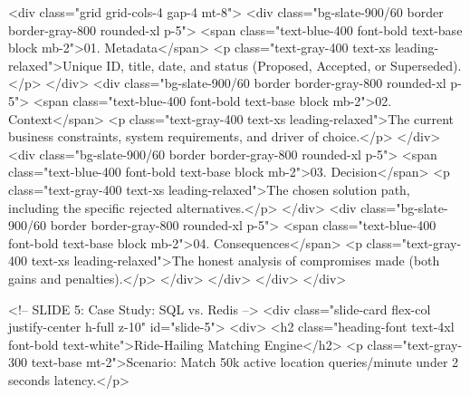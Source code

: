                     <div class="grid grid-cols-4 gap-4 mt-8">
                        <div class="bg-slate-900/60 border border-gray-800 rounded-xl p-5">
                            <span class="text-blue-400 font-bold text-base block mb-2">01. Metadata</span>
                            <p class="text-gray-400 text-xs leading-relaxed">Unique ID, title, date, and status (Proposed, Accepted, or Superseded).</p>
                        </div>
                        <div class="bg-slate-900/60 border border-gray-800 rounded-xl p-5">
                            <span class="text-blue-400 font-bold text-base block mb-2">02. Context</span>
                            <p class="text-gray-400 text-xs leading-relaxed">The current business constraints, system requirements, and driver of choice.</p>
                        </div>
                        <div class="bg-slate-900/60 border border-gray-800 rounded-xl p-5">
                            <span class="text-blue-400 font-bold text-base block mb-2">03. Decision</span>
                            <p class="text-gray-400 text-xs leading-relaxed">The chosen solution path, including the specific rejected alternatives.</p>
                        </div>
                        <div class="bg-slate-900/60 border border-gray-800 rounded-xl p-5">
                            <span class="text-blue-400 font-bold text-base block mb-2">04. Consequences</span>
                            <p class="text-gray-400 text-xs leading-relaxed">The honest analysis of compromises made (both gains and penalties).</p>
                        </div>
                    </div>
                </div>
            </div>

            <!-- SLIDE 5: Case Study: SQL vs. Redis -->
            <div class="slide-card flex-col justify-center h-full z-10" id="slide-5">
                <div>
                    <h2 class="heading-font text-4xl font-bold text-white">Ride-Hailing Matching Engine</h2>
                    <p class="text-gray-300 text-base mt-2">Scenario: Match 50k active location queries/minute under 2 seconds latency.</p>
                    
